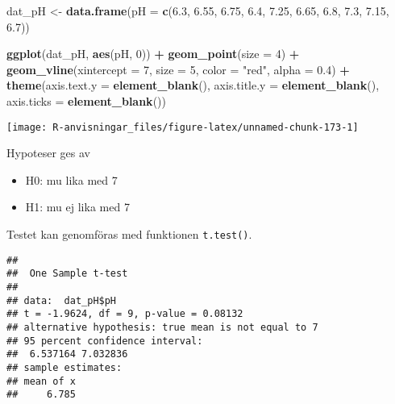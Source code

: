 \documentclass[
]{book}
\newenvironment{Shaded}{\begin{snugshade}}{\end{snugshade}}
\newcommand{\AttributeTok}[1]{\textcolor[rgb]{0.13,0.29,0.53}{#1}}
\newcommand{\DecValTok}[1]{\textcolor[rgb]{0.00,0.00,0.81}{#1}}
\newcommand{\FloatTok}[1]{\textcolor[rgb]{0.00,0.00,0.81}{#1}}
\newcommand{\FunctionTok}[1]{\textcolor[rgb]{0.13,0.29,0.53}{\textbf{#1}}}
\newcommand{\NormalTok}[1]{#1}
\newcommand{\OtherTok}[1]{\textcolor[rgb]{0.56,0.35,0.01}{#1}}
\newcommand{\SpecialCharTok}[1]{\textcolor[rgb]{0.81,0.36,0.00}{\textbf{#1}}}
\newcommand{\StringTok}[1]{\textcolor[rgb]{0.31,0.60,0.02}{#1}}
\providecommand{\tightlist}{%
  \setlength{\itemsep}{0pt}\setlength{\parskip}{0pt}}
\theoremstyle{definition}
\theoremstyle{definition}
\theoremstyle{definition}
\theoremstyle{definition}
\theoremstyle{remark}
\begin{document}
\begin{Shaded}
\begin{Highlighting}[]
\NormalTok{dat\_pH }\OtherTok{\textless{}{-}} \FunctionTok{data.frame}\NormalTok{(}\AttributeTok{pH =} \FunctionTok{c}\NormalTok{(}\FloatTok{6.3}\NormalTok{, }\FloatTok{6.55}\NormalTok{, }\FloatTok{6.75}\NormalTok{, }\FloatTok{6.4}\NormalTok{, }\FloatTok{7.25}\NormalTok{, }\FloatTok{6.65}\NormalTok{, }\FloatTok{6.8}\NormalTok{, }\FloatTok{7.3}\NormalTok{, }\FloatTok{7.15}\NormalTok{, }\FloatTok{6.7}\NormalTok{))}

\FunctionTok{ggplot}\NormalTok{(dat\_pH, }\FunctionTok{aes}\NormalTok{(pH, }\DecValTok{0}\NormalTok{)) }\SpecialCharTok{+}
  \FunctionTok{geom\_point}\NormalTok{(}\AttributeTok{size =} \DecValTok{4}\NormalTok{) }\SpecialCharTok{+}
  \FunctionTok{geom\_vline}\NormalTok{(}\AttributeTok{xintercept =} \DecValTok{7}\NormalTok{, }\AttributeTok{size =} \DecValTok{5}\NormalTok{, }\AttributeTok{color =} \StringTok{"red"}\NormalTok{, }\AttributeTok{alpha =} \FloatTok{0.4}\NormalTok{) }\SpecialCharTok{+}
  \FunctionTok{theme}\NormalTok{(}\AttributeTok{axis.text.y =} \FunctionTok{element\_blank}\NormalTok{(), }
        \AttributeTok{axis.title.y =} \FunctionTok{element\_blank}\NormalTok{(), }
        \AttributeTok{axis.ticks =} \FunctionTok{element\_blank}\NormalTok{())}
\end{Highlighting}
\end{Shaded}

\begin{center}\texttt{[image: R-anvisningar\_files/figure-latex/unnamed-chunk-173-1]} \end{center}

Hypoteser ges av

\begin{itemize}
\tightlist
\item
  H0: mu lika med 7
\item
  H1: mu ej lika med 7
\end{itemize}

Testet kan genomföras med funktionen \texttt{t.test()}.

\begin{Shaded}
\end{Shaded}

\begin{verbatim}
## 
##  One Sample t-test
## 
## data:  dat_pH$pH
## t = -1.9624, df = 9, p-value = 0.08132
## alternative hypothesis: true mean is not equal to 7
## 95 percent confidence interval:
##  6.537164 7.032836
## sample estimates:
## mean of x 
##     6.785
\end{verbatim}
\end{document}
